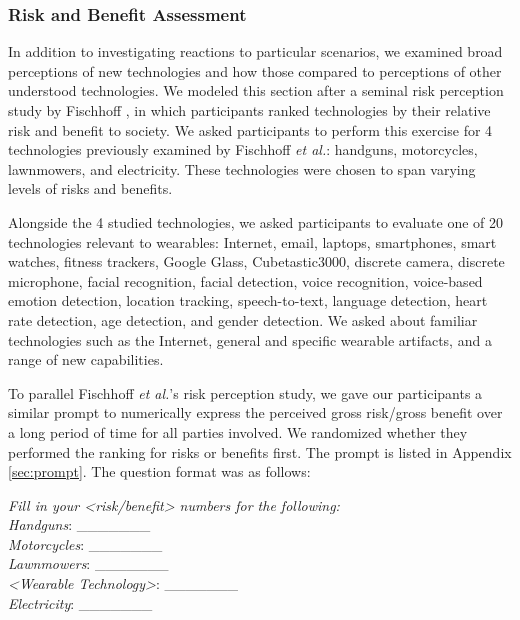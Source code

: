 \subsubsection{Risk and Benefit Assessment}
In addition to investigating reactions to particular scenarios, we examined broad perceptions of new technologies and how those compared to perceptions of other understood technologies. We modeled this section after a seminal risk perception study by Fischhoff \etal\cite{Fischhoff}, in which participants ranked technologies by their relative risk and benefit to society. We asked participants to perform this exercise for 4 technologies previously examined by Fischhoff {\it et al.}: handguns, motorcycles, lawnmowers, and electricity.  These technologies were chosen to span varying levels of risks and benefits.

Alongside the 4 studied technologies, we asked participants to evaluate one of 20 technologies relevant to wearables: Internet, email, laptops, smartphones, smart watches, fitness trackers, Google Glass, Cubetastic3000, discrete camera, discrete microphone, facial recognition, facial detection, voice recognition, voice-based emotion detection, location tracking, speech-to-text, language detection, heart rate detection, age detection, and gender detection. We asked about familiar technologies such as the Internet, general and specific wearable artifacts, and a range of new capabilities. 


To parallel Fischhoff {\it et al.}'s risk perception study, we gave our participants a similar prompt to numerically express the perceived gross risk/gross benefit over a long period of time for all parties involved. We randomized whether they performed the ranking for risks or benefits first. The prompt is listed in Appendix \ref{sec:prompt}. The question format was as follows:

\textit{Fill in your <risk/benefit> numbers for the following:}\\[-.5cm]

\textit{Handguns}: \_\_\_\_\_\_\_ \\
\textit{Motorcycles}: \_\_\_\_\_\_\_\\
\textit{Lawnmowers}: \_\_\_\_\_\_\_\\
\textit{<Wearable Technology>}: \_\_\_\_\_\_\_\\
\textit{Electricity}: \_\_\_\_\_\_\_\\ [-.5cm]

